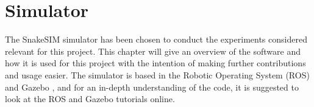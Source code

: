 \chapter{Simulator}\label{chapter:simulator}

The SnakeSIM simulator \cite{sanfilippo2018snakesim} has been chosen to conduct the experiments considered relevant for this project. This chapter will give an overview of the software and how it is used for this project with the intention of making further contributions and usage easier. The simulator is based in the Robotic Operating System (ROS) \cite{quigley2009ros} and Gazebo \cite{koenig2004design}, and for an in-depth understanding of the code, it is suggested to look at the ROS and Gazebo tutorials online.




%
